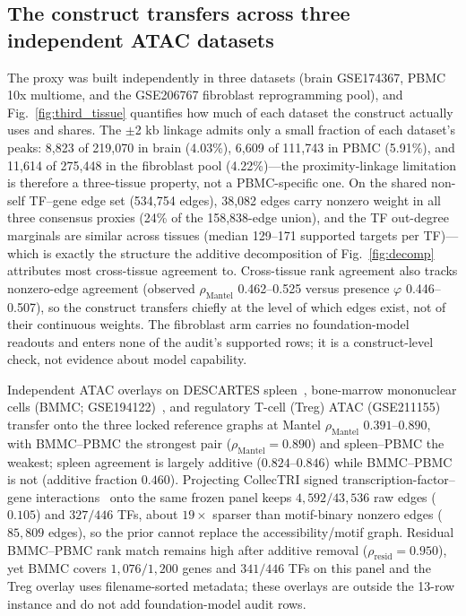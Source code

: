 \documentclass[fleqn,10pt,lineno]{wlpeerj}
\begin{document}
\subsection{The construct transfers across three independent ATAC datasets}\label{sec:third_tissue}
The proxy was built independently in three datasets (brain GSE174367, PBMC 10x multiome, and the
GSE206767 fibroblast reprogramming pool), and Fig.~\ref{fig:third_tissue} quantifies how much of
each dataset the construct actually uses and shares. The $\pm$2 kb linkage admits only a small
fraction of each dataset's peaks: 8,823 of 219,070 in brain (4.03\%), 6,609 of 111,743 in PBMC
(5.91\%), and 11,614 of 275,448 in the fibroblast pool (4.22\%)---the proximity-linkage limitation
is therefore a three-tissue property, not a PBMC-specific one. On the shared non-self TF--gene
edge set (534,754 edges), 38,082 edges carry nonzero weight in all three consensus proxies (24\%
of the 158,838-edge union), and the TF out-degree marginals are similar across tissues (median
129--171 supported targets per TF)---which is exactly the structure the additive decomposition of
Fig.~\ref{fig:decomp} attributes most cross-tissue agreement to. Cross-tissue rank agreement also
tracks nonzero-edge agreement (observed $\rho_{\mathrm{Mantel}}$ 0.462--0.525 versus presence $\varphi$
0.446--0.507), so the construct transfers chiefly at the level of which edges exist, not of their
continuous weights. The fibroblast arm carries no foundation-model readouts and enters none of the
audit's supported rows; it is a construct-level check, not evidence about model capability.

Independent ATAC overlays on DESCARTES spleen~\citep{domcke2020descartes}, bone-marrow mononuclear cells (BMMC; GSE194122)~\citep{luecken2021sandbox}, and regulatory T-cell (Treg) ATAC (GSE211155)~\citep{itahashi2022batf} transfer onto the three locked reference graphs at Mantel $\rho_{\mathrm{Mantel}}$ $0.391$--$0.890$, with BMMC--PBMC the strongest pair ($\rho_{\mathrm{Mantel}}=0.890$) and spleen--PBMC the weakest; spleen agreement is largely additive ($0.824$--$0.846$) while BMMC--PBMC is not (additive fraction $0.460$). Projecting CollecTRI signed transcription-factor--gene interactions~\citep{mullerdott2023collectri} onto the same frozen panel keeps $4{,}592/43{,}536$ raw edges ($0.105$) and $327/446$ TFs, about $19\times$ sparser than motif-binary nonzero edges ($85{,}809$ edges), so the prior cannot replace the accessibility/motif graph. Residual BMMC--PBMC rank match remains high after additive removal ($\rho_{\mathrm{resid}}=0.950$), yet BMMC covers $1{,}076/1{,}200$ genes and $341/446$ TFs on this panel and the Treg overlay uses filename-sorted metadata; these overlays are outside the 13-row instance and do not add foundation-model audit rows.
\end{document}

